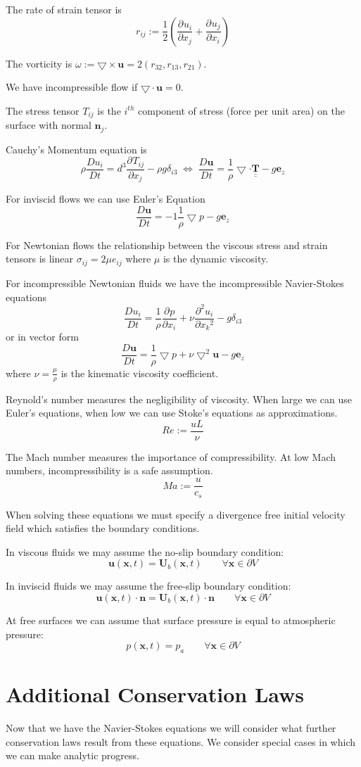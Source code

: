 \documentclass[11pt]{article}
\newcommand*{\pd}[3][]{\ensuremath{\frac{\partial^{#1} {#2}}{\partial {#3}^{#1}}}}
\newcommand*{\md}[1]{\ensuremath{\frac{D #1}{D t}}}
\newcommand{\grad}{\bigtriangledown}
\newcommand{\defeq}{:=}
\newcommand{\tul}[1]{\underline{\underline{#1}}}
\newcommand{\mv}[1]{\textbf{#1}}
\newcommand{\mdf}[1]{{\color{red}#1}}
\begin{document}
The \mdf{rate of strain tensor} is 
$$r_{ij}\defeq\frac{1}{2}\left(\pd{u_i}{x_j}+\pd{u_j}{x_i}\right)$$

The \mdf{vorticity} is $\omega\defeq\grad\times\mv{u}=2(r_{32},r_{13},r_{21})$.

We have \mdf{incompressible flow if} $\grad\cdot\mv{u}=0$.

The \mdf{stress tensor} $T_{ij}$ is the $i^{th}$ component of stress (force per unit area) on the surface with normal $\mv{n}_j$.

\mdf{Cauchy's Momentum equation} is
$$\rho\md{u_i}=d^3\pd{T_{ij}}{x_j}-\rho g\delta_{i3}\;\iff\;\md{\mv{u}}=\frac{1}{\rho}\grad\cdot\tul{\mv{T}}-g\mv{e}_z$$

For inviscid flows we can use \mdf{Euler's Equation}
$$\md{\mv{u}}=-1\frac{1}{\rho}\grad p-g\mv{e}_z$$

For Newtonian flows the relationship between the viscous stress and strain tensors is linear $\sigma_{ij}=2\mu e_{ij}$ where $\mu$ is the dynamic viscosity.

For incompressible Newtonian fluids we have the \mdf{incompressible Navier-Stokes equations}
$$\md{u_i}=\frac{1}{\rho}\pd{p}{x_i}+\nu\pd[2]{u_i}{x_k}-g\delta_{i3}$$
or in vector form
$$\md{\mv{u}}=\frac{1}{\rho}\grad p + \nu \grad^2\mv{u} - g\mv{e}_z$$
where $\nu=\frac{\mu}{\rho}$ is the \mdf{kinematic viscosity coefficient}.

\mdf{Reynold's number} measures the negligibility of viscosity. When large we can use Euler's equations, when low we can use Stoke's equations as approximations.
$$Re\defeq\frac{uL}{\nu}$$

The \mdf{Mach number} measures the importance of compressibility. At low Mach numbers, incompressibility is a safe assumption.
$$Ma\defeq\frac{u}{c_s}$$

When solving these equations we must specify a divergence free \mdf{initial velocity field} which satisfies the boundary conditions.

In viscous fluids we may assume the \mdf{no-slip boundary condition}:
$$\mv{u}(\mv{x},t)=\mv{U}_b(\mv{x},t)\quad\quad\forall\mv{x}\in\partial V$$

In inviscid fluids we may assume the \mdf{free-slip boundary condition}:
$$\mv{u}(\mv{x},t)\cdot\mv{n}=\mv{U}_b(\mv{x},t)\cdot\mv{n}\quad\quad\forall\mv{x}\in\partial V$$

At free surfaces we can assume that surface pressure is equal to atmospheric pressure:
$$p(\mv{x},t)=p_a\quad\quad\forall\mv{x}\in\partial V$$
\section{Additional Conservation Laws}
Now that we have the Navier-Stokes equations we will consider what further conservation laws result from these equations. We consider special cases in which we can make analytic progress.
\end{document}
